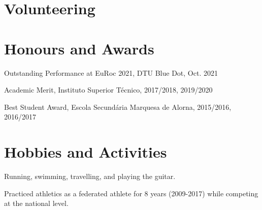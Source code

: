 \documentclass[a4paper,12pt]{article}
\begin{document}
\section{Volunteering}

\ItemListStart
\ItemListEnd



\section{Honours and Awards}

\begin{description}[font=$\circ$]
\itemsep-2pt 
\item {Outstanding Performance at EuRoc 2021, DTU Blue Dot, Oct. 2021}
\item {Academic Merit, Instituto Superior Técnico, 2017/2018, 2019/2020}
\item {Best Student Award, Escola Secundária Marquesa de Alorna, 2015/2016, 2016/2017}
\end{description}



%



\section{Hobbies and Activities}

\begin{description}[font=$\circ$]
\itemsep-2pt
\item {Running, swimming, travelling, and playing the guitar.}
\item {Practiced athletics as a federated athlete for 8 years (2009-2017) while competing at the national level.}
\end{description}
\end{document}
